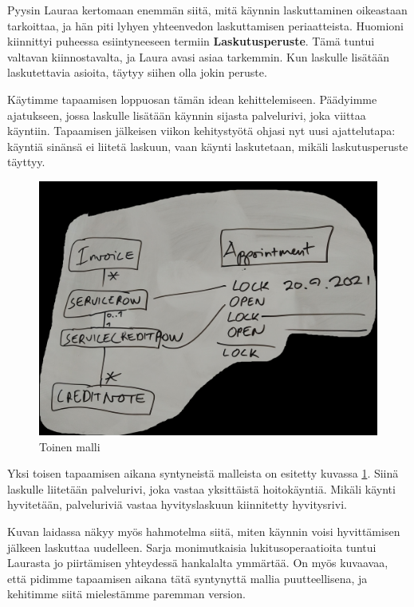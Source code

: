 Pyysin Lauraa kertomaan enemmän siitä, mitä käynnin laskuttaminen
oikeastaan tarkoittaa, ja hän piti lyhyen yhteenvedon laskuttamisen
periaatteista. Huomioni kiinnittyi puheessa esiintyneeseen termiin
\textbf{Laskutusperuste}. Tämä tuntui valtavan kiinnostavalta, ja Laura
avasi asiaa tarkemmin. Kun laskulle lisätään laskutettavia asioita,
täytyy siihen olla jokin peruste.

Käytimme tapaamisen loppuosan tämän idean kehittelemiseen. Päädyimme
ajatukseen, jossa laskulle lisätään käynnin sijasta palvelurivi, joka
viittaa käyntiin. Tapaamisen jälkeisen viikon kehitystyötä ohjasi nyt
uusi ajattelutapa: käyntiä sinänsä ei liitetä laskuun, vaan käynti
laskutetaan, mikäli laskutusperuste täyttyy.

\begin{figure}
\centering
\includegraphics[width=\textwidth,height=0.5\textheight]{illustration/malli2.jpg}
\caption{\label{malli2}Toinen malli}
\end{figure}

Yksi toisen tapaamisen aikana syntyneistä malleista on esitetty kuvassa
\ref{malli2}. Siinä laskulle liitetään palvelurivi, joka vastaa
yksittäistä hoitokäyntiä. Mikäli käynti hyvitetään, palveluriviä vastaa
hyvityslaskuun kiinnitetty hyvitysrivi.

Kuvan laidassa näkyy myös hahmotelma siitä, miten käynnin voisi
hyvittämisen jälkeen laskuttaa uudelleen. Sarja monimutkaisia
lukitusoperaatioita tuntui Laurasta jo piirtämisen yhteydessä hankalalta
ymmärtää. On myös kuvaavaa, että pidimme tapaamisen aikana tätä
syntynyttä mallia puutteellisena, ja kehitimme siitä mielestämme
paremman version.

